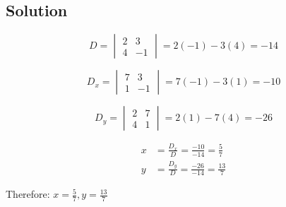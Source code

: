 \subsection*{Solution}

\[
	D = \begin{vmatrix}
		2 & 3 \\
		4 & -1
	\end{vmatrix} = 2(-1) - 3(4) = -14
\]

\[
	D_x = \begin{vmatrix}
		7 & 3 \\
		1 & -1
	\end{vmatrix} = 7(-1) - 3(1) = -10
\]

\[
	D_y = \begin{vmatrix}
		2 & 7 \\
		4 & 1
	\end{vmatrix} = 2(1) - 7(4) = -26
\]

\begin{align*}
	x &= \frac{D_x}{D} = \frac{-10}{-14} = \frac{5}{7} \\
	y &= \frac{D_y}{D} = \frac{-26}{-14} = \frac{13}{7}
\end{align*}

Therefore: $x = \frac{5}{7}, y = \frac{13}{7}$
